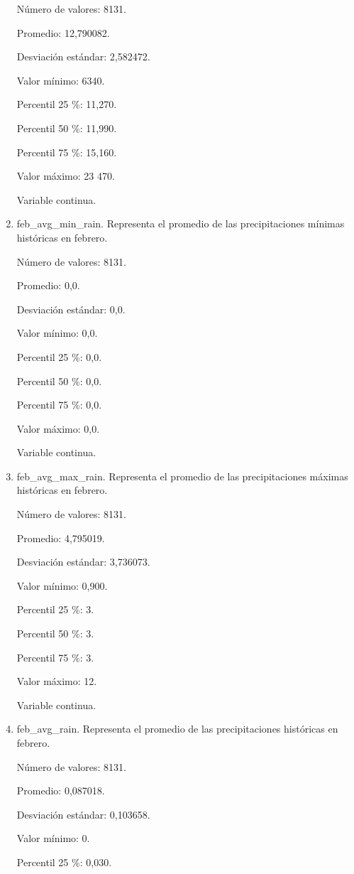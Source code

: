 \begin{enumerate}
	Número de valores: 8131.
	
	Promedio: 12,790082.
	
	Desviación estándar: 2,582472.
	
	Valor mínimo: 6340.
	
	Percentil 25 \%: 11,270.
	
	Percentil 50 \%: 11,990.
	
	Percentil 75 \%: 15,160.
	
	Valor máximo: 23 470.
	
	Variable continua.

	\item feb\_avg\_min\_rain. Representa el promedio de las precipitaciones mínimas históricas en febrero.
	
	Número de valores: 8131.
	
	Promedio: 0,0.
	
	Desviación estándar: 0,0.
	
	Valor mínimo: 0,0.
	
	Percentil 25 \%: 0,0.
	
	Percentil 50 \%: 0,0.
	
	Percentil 75 \%: 0,0.
	
	Valor máximo: 0,0.
	
	Variable continua.

	\item feb\_avg\_max\_rain. Representa el promedio de las precipitaciones máximas históricas en febrero.
	
	Número de valores: 8131.
	
	Promedio: 4,795019.
	
	Desviación estándar: 3,736073.
	
	Valor mínimo: 0,900.
	
	Percentil 25 \%: 3.
	
	Percentil 50 \%: 3.
	
	Percentil 75 \%: 3.
	
	Valor máximo: 12.
	
	Variable continua.

	\item feb\_avg\_rain. Representa el promedio de las precipitaciones históricas en febrero.
	
	Número de valores: 8131.
	
	Promedio: 0,087018.
	
	Desviación estándar: 0,103658.
	
	Valor mínimo: 0.
	
	Percentil 25 \%: 0,030.
	

\end{enumerate}
